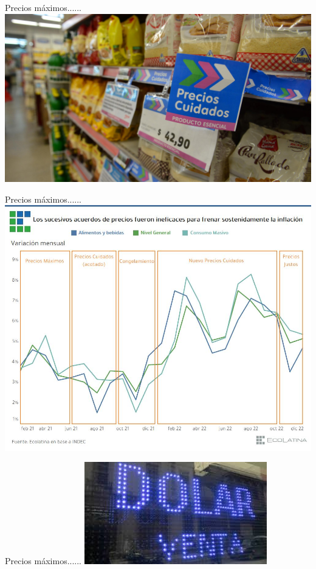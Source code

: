 \documentclass{beamer}
\begin{document}
\begin{frame}{Precios máximos......}
\includegraphics[scale=0.15]{Slides Principios de Economia/Figures/Precioscuidados.jpg}
\end{frame}


\begin{frame}{Precios máximos......}
\centering
\includegraphics[scale=0.45]{Slides Principios de Economia/Figures/Acuerdoprecios.jpg}
\end{frame}


\begin{frame}{Precios máximos......}
\centering
\includegraphics[scale=0.9]{Slides Principios de Economia/Figures/Dolar.jpg}
\end{frame}
\end{document}
